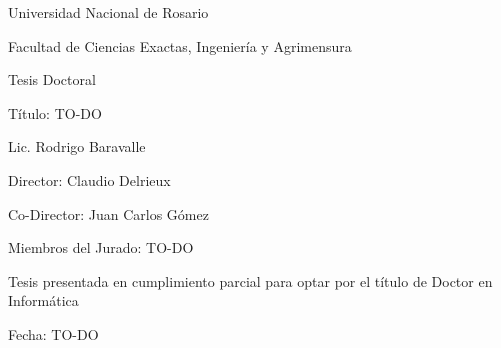 
\begin{titlepage}
\begin{center}

Universidad Nacional de Rosario

Facultad de Ciencias Exactas, Ingeniería y Agrimensura

Tesis Doctoral

\vspace{2cm}


{\huge Título: TO-DO}
\vspace{2cm}

{\large Lic. Rodrigo Baravalle}
\vspace{2cm}

{\large Director: Claudio Delrieux}

{\large Co-Director: Juan Carlos Gómez}

\vspace{2cm}
{\large Miembros del Jurado: TO-DO}

\vspace{2cm}
{\large Tesis presentada en cumplimiento parcial para optar por el título de Doctor en Informática}

\vspace{1cm}
Fecha: TO-DO
\end{center}
\end{titlepage}

